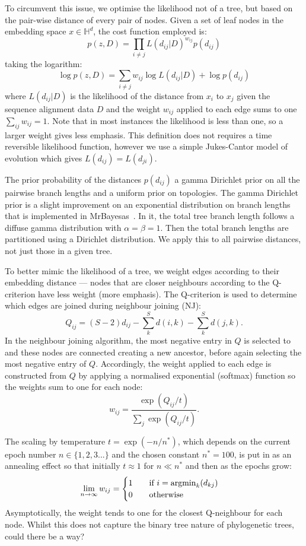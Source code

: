 \documentclass[11pt, twocolumn]{article}
\DeclareMathOperator*{\argmin}{argmin}
\newcommand{\be}{\begin{equation*}}
\newcommand{\ee}{\end{equation*}}
\begin{document}
To circumvent this issue, we optimise the likelihood not of a tree, but based on the pair-wise distance of every pair of nodes.
Given a set of leaf nodes in the embedding space $x \in \mathbb{H}^{d}$, the cost function employed is:
\begin{equation}
p(z, D) = \prod_{i \neq j} L(d_{ij}|D)^{w_{ij}}  p(d_{ij})
\end{equation}
taking the logarithm:
\begin{equation}
\log p(z, D) = \sum_{i \neq j} w_{ij} \log L(d_{ij}|D) + \log p(d_{ij})
\end{equation}
\noindent where $L(d_{ij}|D)$ is the likelihood of the distance from $x_{i}$ to $x_{j}$ given the sequence alignment data $D$ and the weight $w_{ij}$ applied to each edge sums to one $\sum_{ij} w_{ij} = 1$.
Note that in most instances the likelihood is less than one, so a larger weight gives less emphasis.
This definition does not requires a time reversible likelihood function, however we use a simple Jukes-Cantor model of evolution which gives $L(d_{ij})=L(d_{ji})$.

The prior probability of the distances $p(d_{ij})$  a gamma Dirichlet prior on all the pairwise branch lengths and a uniform prior on topologies.
The gamma Dirichlet prior is a slight improvement on an exponential distribution on branch lengths that is implemented in MrBayesas~\cite{rannala2012tail}.
In it, the total tree branch length follows a diffuse gamma distribution with $\alpha = \beta = 1$.
Then the total branch lengths are partitioned using a Dirichlet distribution.
We apply this to all pairwise distances, not just those in a given tree.

To better mimic the likelihood of a tree, we weight edges according to their embedding distance --- nodes that are closer neighbours according to the Q-criterion have less weight (more emphasis).
The Q-criterion is used to determine which edges are joined during neighbour joining (NJ): 
\be
Q_{ij} = (S-2)d_{ij} - \sum_{k}^{S}d(i, k) - \sum_{k}^{S}d(j, k).
\ee
In the neighbour joining algorithm, the most negative entry in $Q$ is selected to and these nodes are connected creating a new ancestor, before again selecting the most negative entry of $Q$.
Accordingly, the weight applied to each edge is constructed from $Q$ by applying a normalised exponential (softmax) function so the weights sum to one for each node:
\be
w_{ij} = \frac{\exp(Q_{ij}/t)}{\sum_{j} \exp(Q_{ij}/t)}.
\ee

The scaling by temperature $t = \exp(-n/n^{*})$, which depends on the current epoch number $n \in \{1,2,3...\}$ and the chosen constant $n^{*}=100$, is put in as an annealing effect so that initially $t\approx 1$ for $n\ll n^{*}$ and then as the epochs grow:
\be
\lim_{n\to\infty} w_{ij} = 
\begin{cases}
1 \qquad \textnormal{if } i = \argmin_{k}(d_{kj}) \\
0 \qquad \textnormal{otherwise}
\end{cases}
\ee
Asymptotically, the weight tends to one for the closest Q-neighbour for each node.
Whilst this does not capture the binary tree nature of phylogenetic trees, could there be a way?
\end{document}
